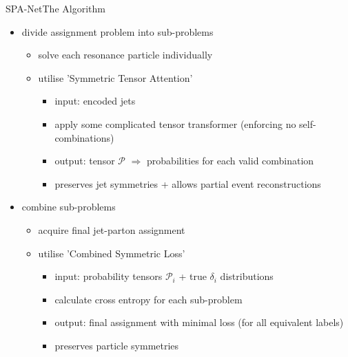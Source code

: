 \documentclass[9pt, aspectratio=169]{beamer}
\begin{document}
\begin{frame}{SPA-Net}{The Algorithm}
    \begin{itemize}
		\item divide assignment problem into sub-problems
		\begin{itemize}
			\item solve each resonance particle individually
			\item utilise 'Symmetric Tensor Attention'
			\begin{itemize}
				\item input: encoded jets
				\item apply some complicated tensor transformer (enforcing no self-combinations)
				\item output: tensor $\mathcal{P}$ $\Rightarrow$ probabilities for each valid combination
				\item preserves jet symmetries + allows partial event reconstructions
			\end{itemize}
 		\end{itemize}
		\item combine sub-problems
		\begin{itemize}
			\item acquire final jet-parton assignment
			\item utilise 'Combined Symmetric Loss'
			\begin{itemize}
				\item input: probability tensors $\mathcal{P}_i$ + true $\delta_i$ distributions
				\item calculate cross entropy for each sub-problem
				\item output: final assignment with minimal loss (for all equivalent labels)  
				\item preserves particle symmetries
			\end{itemize}
		\end{itemize}
	\end{itemize}
\end{frame}
\end{document}
